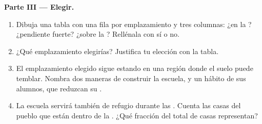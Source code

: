 \begin{problem}
\noindent\textbf{Parte III --- Elegir.}\par\nopagebreak
\begin{enumerate}[resume, beginpenalty=10000]
  \item Dibuja una tabla con una fila por emplazamiento y tres columnas:
        ¿en la ? ¿pendiente fuerte? ¿sobre la ?
        Rellénala con sí o no.
  \item ¿Qué emplazamiento elegirías? Justifica tu elección con la tabla.
  \item El emplazamiento elegido sigue estando en una región donde el
        suelo puede temblar. Nombra dos maneras de construir la escuela, y
        un hábito de sus alumnos, que reduzcan su .
  \item La escuela servirá también de refugio durante las .
        Cuenta las casas del pueblo que están dentro de la .
        ¿Qué fracción del total de casas representan?
\end{enumerate}
\end{problem}
